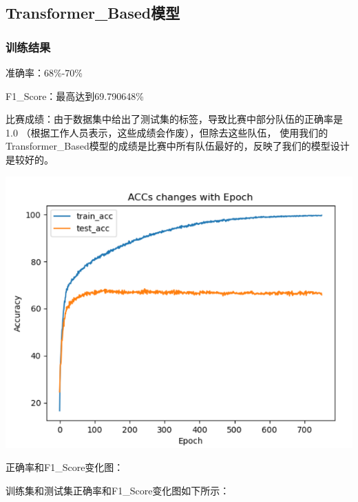 \documentclass[11pt]{article}
\begin{document}
        \subsection{Transformer\_Based模型}
            \subsubsection{训练结果}
            准确率：68\%-70\%

            F1\_Score：最高达到69.790648\%
            
            比赛成绩：由于数据集中给出了测试集的标签，导致比赛中部分队伍的正确率是1.0
            （根据工作人员表示，这些成绩会作废），但除去这些队伍，
            使用我们的Transformer\_Based模型的成绩是比赛中所有队伍最好的，反映了我们的模型设计是较好的。

            \begin{center}
                \includegraphics[scale=1]{graph/result5.png}
            \end{center}

            正确率和F1\_Score变化图：

            训练集和测试集正确率和F1\_Score变化图如下所示：
\end{document}
